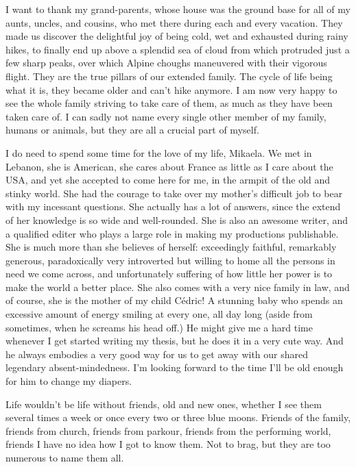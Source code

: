 I want to thank my grand-parents, whose house was the ground base for all of my aunts, uncles, and cousins, who met there during each and every vacation. They made us discover the delightful joy of being cold, wet and exhausted during rainy hikes, to finally end up above a splendid sea of cloud from which protruded just a few sharp peaks, over which Alpine choughs maneuvered with their vigorous flight. They are the true pillars of our extended family. The cycle of life being what it is, they became older and can't hike anymore. I am now very happy to see the whole family striving to take care of them, as much as they have been taken care of. I can sadly not name every single other member of my family, humans or animals, but they are all a crucial part of myself. 

I do need to spend some time for the love of my life, Mikaela. We met in Lebanon, she is American, she cares about France as little as I care about the USA, and yet she accepted to come here for me, in the armpit of the old and stinky world. She had the courage to take over my mother's difficult job to bear with my incessant questions. She actually has a lot of answers, since the extend of her knowledge is so wide and well-rounded. She is also an awesome writer, and a qualified editer who plays a large role in making my productions publishable. She is much more than she believes of herself: exceedingly faithful, remarkably generous, paradoxically very introverted but willing to home all the persons in need we come across, and unfortunately suffering of how little her power is to make the world a better place. She also comes with a very nice family in law, and of course, she is the mother of my child Cédric! A stunning baby who spends an excessive amount of energy smiling at every one, all day long (aside from sometimes, when he screams his head off.) He might give me a hard time whenever I get started writing my thesis, but he does it in a very cute way. And he always embodies a very good way for us to get away with our shared legendary absent-mindedness. I'm looking forward to the time I'll be old enough for him to change my diapers.

Life wouldn't be life without friends, old and new ones, whether I see them several times a week or once every two or three blue moons. Friends of the family, friends from church, friends from parkour, friends from the performing world, friends I have no idea how I got to know them. Not to brag, but they are too numerous to name them all. 

